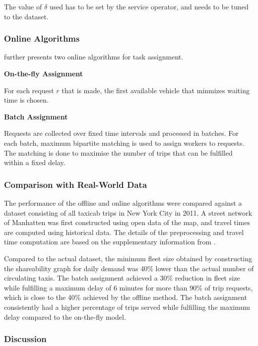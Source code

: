 \documentclass[urop]{nurop}
\begin{document}
The value of $\delta$ used has to be set by the service operator, and needs to be tuned to the dataset.  

\subsubsection{Online Algorithms}
\cite{nature} further presents two online algorithms for task assignment.

\vspace{2mm} \noindent \textbf{On-the-fly Assignment}

\noindent For each request $r$ that is made, the first available vehicle that minmizes waiting time is chosen.

\vspace{2mm} \noindent \textbf{Batch Assignment}

\noindent Requests are collected over fixed time intervals and processed in batches. For each batch, maximum bipartite matching is used to assign workers to requests. The matching is done to maximise the number of trips that can be fulfilled within a fixed delay.

\subsubsection{Comparison with Real-World Data}
The performance of the offline and online algorithms were compared against a dataset consisting of all taxicab trips in New York City in 2011. A street network of Manhatten was first constructed using open data of the map, and travel times are computed using historical data. The details of the preprocessing and travel time computation are based on the supplementary information from \cite{preprocess}. 

Compared to the actual dataset, the minimum fleet size obtained by constructing the shareability graph for daily demand was 40\% lower than the actual number of circulating taxis. The batch assignment achieved a 30\% reduction in fleet size while fulfilling a maximum delay of 6 minutes for more than 90\% of trip requests, which is close to the 40\% achieved by the offline method. The batch assignment consistently had a higher percentage of trips served while fulfilling the maximum delay compared to the on-the-fly model.

\subsubsection{Discussion}
\end{document}
